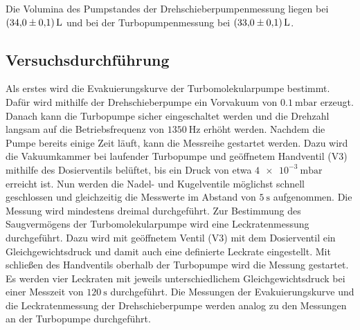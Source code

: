 \noindent
Die Volumina des Pumpstandes der Drehschieberpumpenmessung liegen bei $\SI{34 \pm 0.1}{\litre}$ und bei der Turbopumpenmessung bei $\SI{33 \pm 0.1}{\litre}$.

\subsection{Versuchsdurchführung}
\label{subsec:Versuchsdurchführung}

Als erstes wird die Evakuierungskurve der Turbomolekularpumpe bestimmt. Dafür wird mithilfe der Drehschieberpumpe ein Vorvakuum von $\SI{0,1}{\milli\bar}$ erzeugt. Danach kann die Turbopumpe sicher eingeschaltet werden und die Drehzahl
langsam auf die Betriebsfrequenz von $\SI{1350}{\hertz}$ erhöht werden. Nachdem die Pumpe bereits einige Zeit läuft, kann die Messreihe gestartet werden. Dazu wird die Vakuumkammer bei laufender Turbopumpe und geöffnetem Handventil (V3) mithilfe des Dosierventils belüftet,
bis ein Druck von etwa $\SI{4 e-3}{\milli\bar}$ erreicht ist. Nun werden die Nadel- und Kugelventile möglichst schnell geschlossen und gleichzeitig die Messwerte im Abstand von $\SI{5}{\second}$ aufgenommen. Die Messung wird mindestens dreimal durchgeführt. \newline
Zur Bestimmung des Saugvermögens der Turbomolekularpumpe wird eine Leckratenmessung durchgeführt. Dazu wird mit geöffnetem Ventil (V3) mit dem Dosierventil ein Gleichgewichtsdruck und damit auch eine definierte Leckrate eingestellt. Mit 
schließen des Handventils oberhalb der Turbopumpe wird die Messung gestartet. Es werden vier Leckraten mit jeweils unterschiedlichem Gleichgewichtsdruck bei einer Messzeit von $\SI{120}{\second}$ durchgeführt. \newline
Die Messungen der Evakuierungskurve und die Leckratenmessung der Drehschieberpumpe werden analog zu den Messungen an der Turbopumpe durchgeführt.